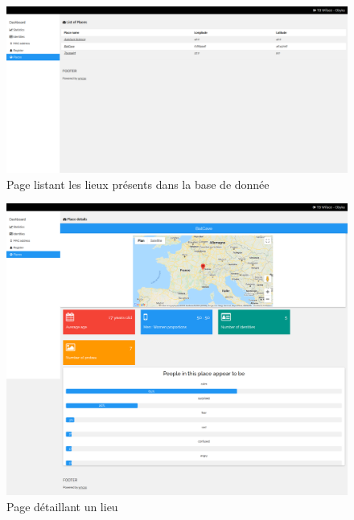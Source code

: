 \clearpage
\newpage
\thispagestyle{empty}
\begin{landscape}
    \centering
\thispagestyle{empty}
\begin{figure}[h]
	\includegraphics[width=\linewidth]{images/dashboard/places.png}
	\caption{Page listant les lieux présents dans la base de donnée}
	\label{fig:dashboard_list_places}
\end{figure}
\end{landscape}

\clearpage
\newpage
\thispagestyle{empty}
\begin{landscape}
    \centering
\thispagestyle{empty}
\begin{figure}[h]
	\includegraphics[width=\linewidth]{images/dashboard/detailled_place.png}
	\caption{Page détaillant un lieu}
	\label{fig:dashboard_place}
\end{figure}
\end{landscape}






